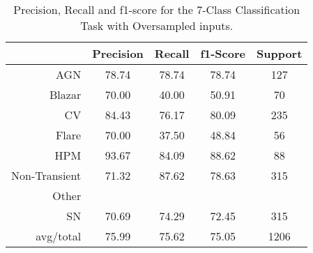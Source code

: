 \begin{table}
\centering
\begin{tabular}{|r|c|c|c|c|}
\hline
\multicolumn{1}{|l|}{} & Precision & Recall & f1-Score & Support \\ \hline \hline
AGN                    & 78.74              & 78.74             & 78.74             & 127             \\ \hline
Blazar                 & 70.00           & 40.00          & 50.91          & 70          \\ \hline
CV                     & 84.43               & 76.17              & 80.09              & 235              \\ \hline
Flare                  & 70.00            & 37.50           & 48.84           & 56           \\ \hline
HPM                    & 93.67              & 84.09             & 88.62             & 88             \\ \hline
Non-Transient          & 71.32    & 87.62   & 78.63   & 315   \\ \hline
Other                  &             &            &            &            \\ \hline
SN                     & 70.69               & 74.29              & 72.45              & 315              \\ \hline
avg/total              & 75.99            & 75.62           & 75.05           & 1206           \\ \hline
\end{tabular}
\caption{Precision, Recall and f1-score for the 7-Class Classification Task with Oversampled inputs.}
\label{Overall-Scores-7-Class-Oversampled}
\end{table}
